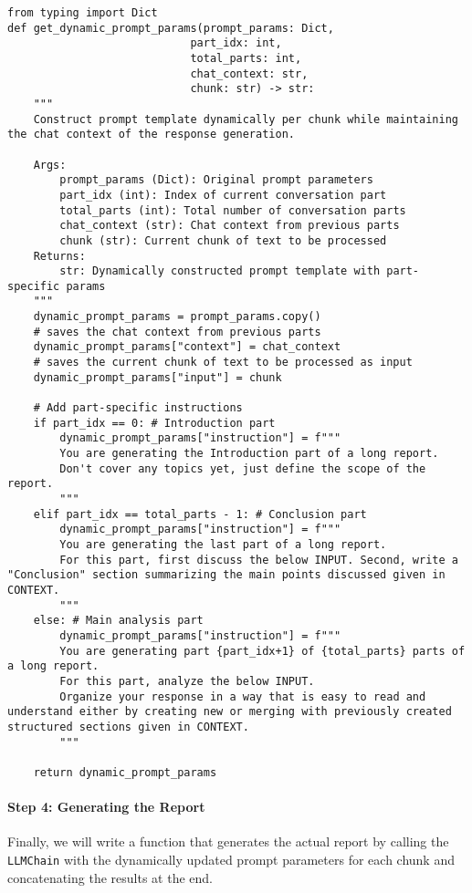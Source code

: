 \begin{verbatim}
from typing import Dict
def get_dynamic_prompt_params(prompt_params: Dict, 
                            part_idx: int, 
                            total_parts: int,
                            chat_context: str,
                            chunk: str) -> str:
    """
    Construct prompt template dynamically per chunk while maintaining the chat context of the response generation.
    
    Args:
        prompt_params (Dict): Original prompt parameters
        part_idx (int): Index of current conversation part
        total_parts (int): Total number of conversation parts
        chat_context (str): Chat context from previous parts
        chunk (str): Current chunk of text to be processed
    Returns:
        str: Dynamically constructed prompt template with part-specific params
    """
    dynamic_prompt_params = prompt_params.copy()
    # saves the chat context from previous parts
    dynamic_prompt_params["context"] = chat_context
    # saves the current chunk of text to be processed as input
    dynamic_prompt_params["input"] = chunk
    
    # Add part-specific instructions
    if part_idx == 0: # Introduction part
        dynamic_prompt_params["instruction"] = f"""
        You are generating the Introduction part of a long report.
        Don't cover any topics yet, just define the scope of the report.
        """
    elif part_idx == total_parts - 1: # Conclusion part
        dynamic_prompt_params["instruction"] = f"""
        You are generating the last part of a long report. 
        For this part, first discuss the below INPUT. Second, write a "Conclusion" section summarizing the main points discussed given in CONTEXT.
        """
    else: # Main analysis part
        dynamic_prompt_params["instruction"] = f"""
        You are generating part {part_idx+1} of {total_parts} parts of a long report.
        For this part, analyze the below INPUT.
        Organize your response in a way that is easy to read and understand either by creating new or merging with previously created structured sections given in CONTEXT.
        """
    
    return dynamic_prompt_params
\end{verbatim}
\paragraph{Step 4: Generating the Report}

Finally, we will write a function that generates the actual report by calling the \texttt{LLMChain} with the dynamically updated prompt parameters for each chunk and concatenating the results at the end.

